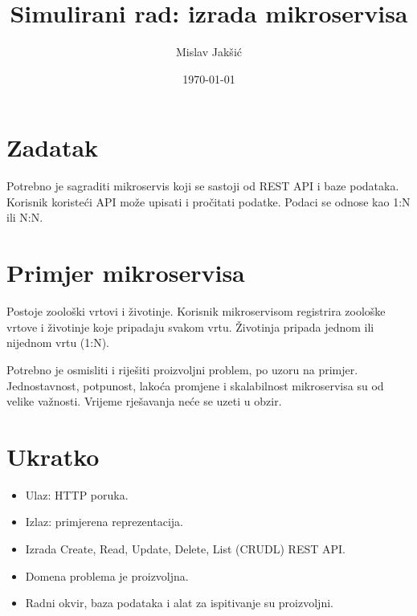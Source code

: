 \documentclass{article}
\title{Simulirani rad: izrada mikroservisa}
\author{Mislav Jakšić}
\date{\today}
\begin{document}
\maketitle

\section{Zadatak}

Potrebno je sagraditi mikroservis koji se sastoji od REST API i baze podataka. Korisnik koristeći API može upisati i pročitati podatke. Podaci se odnose kao 1:N ili N:N.

\section{Primjer mikroservisa}

Postoje zoološki vrtovi i životinje. Korisnik mikroservisom registrira zoološke vrtove i životinje koje pripadaju svakom vrtu. Životinja pripada jednom ili nijednom vrtu (1:N).

Potrebno je osmisliti i riješiti proizvoljni problem, po uzoru na primjer. Jednostavnost, potpunost, lakoća promjene i skalabilnost mikroservisa su od velike važnosti. Vrijeme rješavanja neće se uzeti u obzir.

\section{Ukratko}

\begin{itemize}
  \item Ulaz: HTTP poruka.
  \item Izlaz: primjerena reprezentacija.
  \item Izrada Create, Read, Update, Delete, List (CRUDL) REST API.
  \item Domena problema je proizvoljna.
  \item Radni okvir, baza podataka i alat za ispitivanje su proizvoljni.
\end{itemize}
\end{document}
